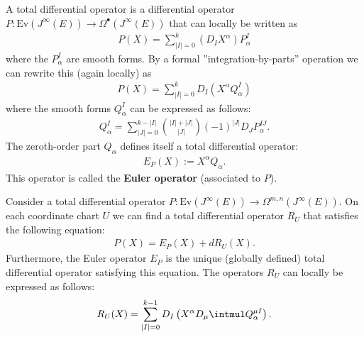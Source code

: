     \begin{property}
        A total differential operator is a differential operator $P:\text{Ev}(J^\infty(E))\rightarrow\Omega^\bullet(J^\infty(E))$ that can locally be written as
        \begin{gather}
            P(X) = \sum_{|I|=0}^k\left(D_IX^\alpha\right)P^I_\alpha
        \end{gather}
        where the $P^I_\alpha$ are smooth forms. By a formal ''integration-by-parts'' operation we can rewrite this (again locally) as
        \begin{gather}
            \label{var:Q_forms}
            P(X) = \sum_{|I|=0}^kD_I\left(X^\alpha Q^I_\alpha\right)
        \end{gather}
        where the smooth forms $Q^I_\alpha$ can be expressed as follows:
        \begin{gather}
            Q^I_\alpha = \sum_{|J|=0}^{k-|I|}\binom{|I|+|J|}{|J|}(-1)^{|J|}D_JP^{IJ}_\alpha.
        \end{gather}
        The zeroth-order part $Q_\alpha$ defines itself a total differential operator:
        \begin{gather}
            E_P(X) := X^\alpha Q_\alpha.
        \end{gather}
        This operator is called the \textbf{Euler operator} (associated to $P$).
    \end{property}
    \begin{property}\label{var:differential_operator_decomposition}
        Consider a total differential operator $P:\text{Ev}(J^\infty(E))\rightarrow\Omega^{m,n}(J^\infty(E))$. On each coordinate chart $U$ we can find a total differential operator $R_U$ that satisfies the following equation:
        \begin{gather}
            P(X) = E_P(X) + dR_U(X).
        \end{gather}
        Furthermore, the Euler operator $E_P$ is the unique (globally defined) total differential operator satisfying this equation. The operators $R_U$ can locally be expressed as follows:
        \begin{gather}
            R_U(X) = \sum_{|I|=0}^{k-1}D_I\left(X^\alpha D_\mu\intmul Q^{\mu I}_\alpha\right).
        \end{gather}
    \end{property}


